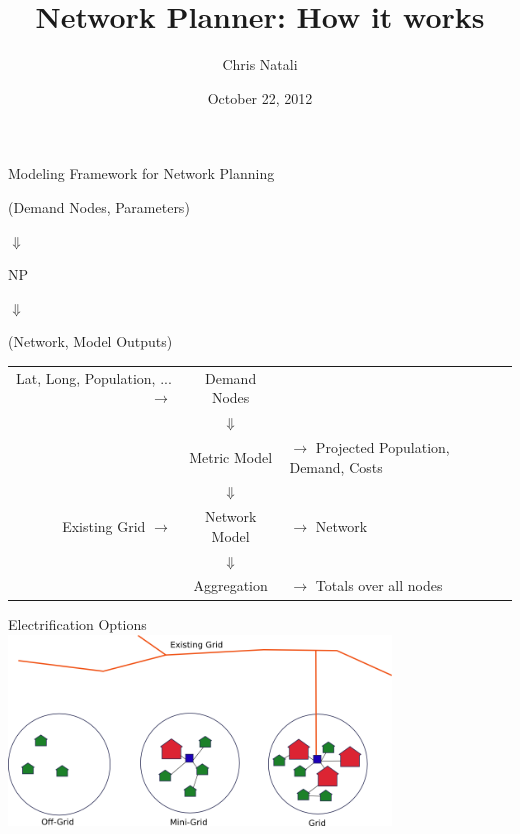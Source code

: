 \documentclass{beamer}
\title{Network Planner:  How it works}
\author{Chris Natali}
\institute{Modi Labs at Columbia University}
\date{October 22, 2012}
\begin{document}
\begin{frame}
  \begin{center}
  {\large Modeling Framework for Network Planning}

  \bigskip

  (Demand Nodes, Parameters) 
  
  $\Downarrow$ 
  
  NP 
  
  $\Downarrow$ 
  
  (Network, Model Outputs)
  \end{center}
\end{frame}

\begin{frame}
  \begin{tabular}{r c l}
    {\tiny Lat, Long, Population, ...} $\rightarrow$ & Demand Nodes & \\
    & $\Downarrow$ & \\
    & Metric Model & $\rightarrow$ {\tiny Projected Population, Demand, Costs} \\
    & $\Downarrow$ & \\
    {\tiny Existing Grid} $\rightarrow$ & Network Model & $\rightarrow$ {\tiny Network} \\
    & $\Downarrow$ & \\
    & Aggregation & $\rightarrow$ {\tiny Totals over all nodes} \\
  \end{tabular}
\end{frame}

\begin{frame}{Electrification Options}
  \includegraphics[width=4.0in,height=2.0in]{../diagrams/np-electrification-nodes.png}
\end{frame}
\end{document}
